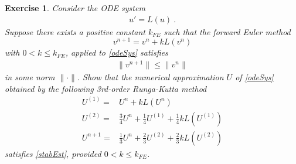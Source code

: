 \documentclass[10pt,letterpaper]{article}
\newcommand{\rb}[1]{ \left(  {#1} \right) }
\newcommand{\frb}[1]{ \left(  {#1} \right) }
\theoremstyle{break}
\newtheorem{exercise}{Exercise}
\begin{document}
\begin{exercise}
\item
Consider the ODE system
\begin{gather} \label{odeSys}
	u'=L(u)\ .
\end{gather}%
Suppose there exists a positive constant $k_{FE}$ such that the forward Euler method
$$
	v^{n+1}=v^n+kL\frb{v^n}
$$
with $0< k\le k_{FE}$, applied to \eqref{odeSys} satisfies
\begin{gather} \label{stabEst}
	\|v^{n+1}\|\le\|v^n\|
\end{gather}%
in some norm $\|\cdot\|$.
Show that the numerical approximation $U$ of \eqref{odeSys} obtained by the following 3rd-order Runga-Kutta method
\begin{align*}
	U^{\left(1\right)}= & U^{n}+kL\left(U^{n}\right)\\
	U^{\left(2\right)}= & \frac{3}{4}U^{n}+\frac{1}{4}U^{\left(1\right)}+\frac{1}{4}kL\frb{U^{\left(1\right)}}\\
	U^{n+1}= & \frac{1}{3}U^{n}+\frac{2}{3}U^{\left(2\right)}+\frac{2}{3}kL\frb{U^{\left(2\right)}}
\end{align*}
satisfies \eqref{stabEst}, provided $0< k\le k_{FE}$.


%
%
%



\end{exercise}



\def\hbu{\boldsymbol{\hat u}}
\def\bpsi{\boldsymbol{\psi}}


\def\bu{\boldsymbol{u}}
\def\bv{\boldsymbol{v}}

\def\bpsi{\boldsymbol{\psi}}
\def\hbForce{\boldsymbol{\hat g}}
\end{document}
